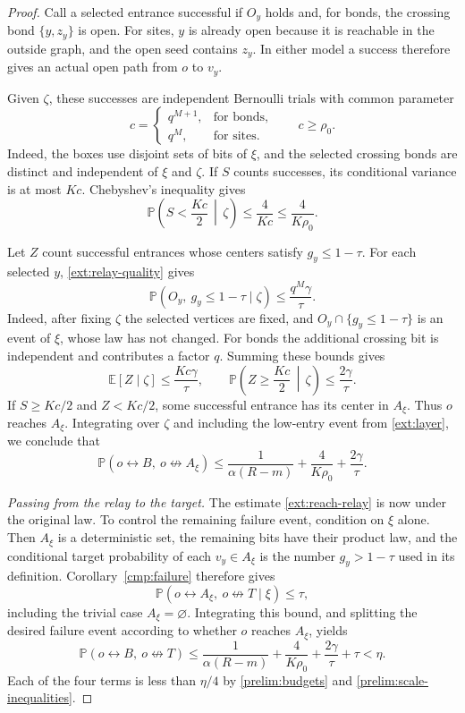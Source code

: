 \documentclass[11pt]{article}
\theoremstyle{definition}
\theoremstyle{remark}
\numberwithin{equation}{section}
\begin{document}
\begin{proof}
Call a selected entrance successful if $O_y$ holds and, for bonds,
the crossing bond $\{y,z_y\}$ is open. For sites, $y$ is already
open because it is reachable in the outside graph, and the open
seed contains $z_y$. In either model a success therefore gives an
actual open path from $o$ to $v_y$.

Given $\zeta$, these successes are independent Bernoulli trials with
common parameter
\[
 c=\begin{cases}
 q^{M+1},&\text{for bonds},\\
 q^M,&\text{for sites}.
 \end{cases}
 \qquad c\ge\rho_0.
\]
Indeed, the boxes use disjoint sets of bits of $\xi$, and the selected
crossing bonds are distinct and independent of $\xi$ and $\zeta$.
If $S$ counts successes, its conditional variance is at most $Kc$.
Chebyshev's inequality gives
\begin{equation}
 \mathbb P\left(S<\frac{Kc}{2}\,\middle|\,\zeta\right)
 \le \frac{4}{Kc}\le\frac{4}{K\rho_0}.
 \label{ext:success-count}
\end{equation}

Let $Z$ count successful entrances whose centers satisfy $g_y\le1-\tau$.
For each selected $y$, \eqref{ext:relay-quality} gives
\[
 \mathbb P(O_y,\ g_y\le1-\tau\mid\zeta)
 \le\frac{q^M\gamma}{\tau}.
\]
Indeed, after fixing $\zeta$ the selected vertices are fixed, and
$O_y\cap\{g_y\le1-\tau\}$ is an event of $\xi$, whose law has not
changed. For bonds the additional crossing bit is independent and
contributes a factor $q$. Summing these bounds gives
\[
 \mathbb E[Z\mid\zeta]\le\frac{Kc\gamma}{\tau},
 \qquad
 \mathbb P\left(Z\ge\frac{Kc}{2}\,\middle|\,\zeta\right)
 \le\frac{2\gamma}{\tau}.
\]
If $S\ge Kc/2$ and $Z<Kc/2$, some successful entrance has its center
in $A_\xi$. Thus $o$ reaches $A_\xi$. Integrating over $\zeta$ and
including the low-entry event from \eqref{ext:layer}, we conclude that
\begin{equation}
 \mathbb P(o\leftrightarrow B,\ o\not\leftrightarrow A_\xi)
 \le \frac{1}{\alpha(R-m)}
       +\frac{4}{K\rho_0}+\frac{2\gamma}{\tau}.
 \label{ext:reach-relay}
\end{equation}

\emph{Passing from the relay to the target.}
The estimate \eqref{ext:reach-relay} is now under the original law.
To control the remaining failure event, condition on $\xi$ alone.
Then $A_\xi$ is a deterministic set, the remaining bits have their
product law, and the conditional target probability of each
$v_y\in A_\xi$ is the number $g_y>1-\tau$ used in its definition.
Corollary~\ref{cmp:failure} therefore gives
\[
 \mathbb P(o\leftrightarrow A_\xi,\ o\not\leftrightarrow T
             \mid\xi)\le\tau,
\]
including the trivial case $A_\xi=\varnothing$.
Integrating this bound, and splitting the desired failure event
according to whether $o$ reaches $A_\xi$, yields
\[
 \mathbb P(o\leftrightarrow B,\ o\not\leftrightarrow T)
 \le\frac{1}{\alpha(R-m)}
 +\frac{4}{K\rho_0}+\frac{2\gamma}{\tau}+\tau<\eta.
\]
Each of the four terms is less than $\eta/4$ by
\eqref{prelim:budgets} and \eqref{prelim:scale-inequalities}.
\end{proof}
\end{document}
